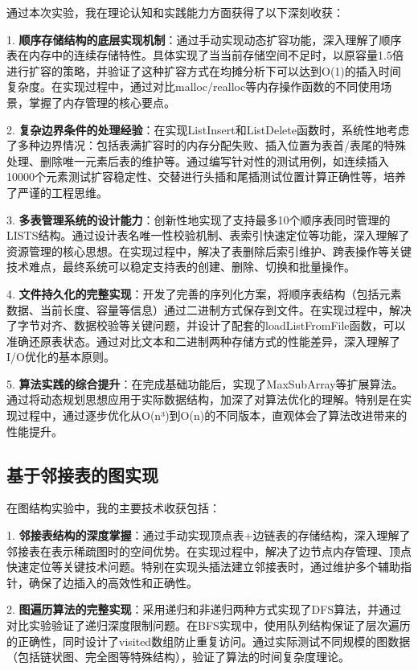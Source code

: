 \documentclass[supercite]{Experimental_Report}
\theoremstyle{definition}
\begin{document}
通过本次实验，我在理论认知和实践能力方面获得了以下深刻收获：

1. \textbf{顺序存储结构的底层实现机制}：通过手动实现动态扩容功能，深入理解了顺序表在内存中的连续存储特性。具体实现了当当前存储空间不足时，以原容量1.5倍进行扩容的策略，并验证了这种扩容方式在均摊分析下可以达到O(1)的插入时间复杂度。在实现过程中，通过对比malloc/realloc等内存操作函数的不同使用场景，掌握了内存管理的核心要点。

2. \textbf{复杂边界条件的处理经验}：在实现ListInsert和ListDelete函数时，系统性地考虑了多种边界情况：包括表满扩容时的内存分配失败、插入位置为表首/表尾的特殊处理、删除唯一元素后表的维护等。通过编写针对性的测试用例，如连续插入10000个元素测试扩容稳定性、交替进行头插和尾插测试位置计算正确性等，培养了严谨的工程思维。

3. \textbf{多表管理系统的设计能力}：创新性地实现了支持最多10个顺序表同时管理的LISTS结构。通过设计表名唯一性校验机制、表索引快速定位等功能，深入理解了资源管理的核心思想。在实现过程中，解决了表删除后索引维护、跨表操作等关键技术难点，最终系统可以稳定支持表的创建、删除、切换和批量操作。

4. \textbf{文件持久化的完整实现}：开发了完善的序列化方案，将顺序表结构（包括元素数据、当前长度、容量等信息）通过二进制方式保存到文件。在实现过程中，解决了字节对齐、数据校验等关键问题，并设计了配套的loadListFromFile函数，可以准确还原表状态。通过对比文本和二进制两种存储方式的性能差异，深入理解了I/O优化的基本原则。

5. \textbf{算法实践的综合提升}：在完成基础功能后，实现了MaxSubArray等扩展算法。通过将动态规划思想应用于实际数据结构，加深了对算法优化的理解。特别是在实现过程中，通过逐步优化从O(n³)到O(n)的不同版本，直观体会了算法改进带来的性能提升。

\subsection{基于邻接表的图实现}

在图结构实验中，我的主要技术收获包括：

1. \textbf{邻接表结构的深度掌握}：通过手动实现顶点表+边链表的存储结构，深入理解了邻接表在表示稀疏图时的空间优势。在实现过程中，解决了边节点内存管理、顶点快速定位等关键技术问题。特别在实现头插法建立邻接表时，通过维护多个辅助指针，确保了边插入的高效性和正确性。

2. \textbf{图遍历算法的完整实现}：采用递归和非递归两种方式实现了DFS算法，并通过对比实验验证了递归深度限制问题。在BFS实现中，使用队列结构保证了层次遍历的正确性，同时设计了visited数组防止重复访问。通过实际测试不同规模的图数据（包括链状图、完全图等特殊结构），验证了算法的时间复杂度理论。
\end{document}
